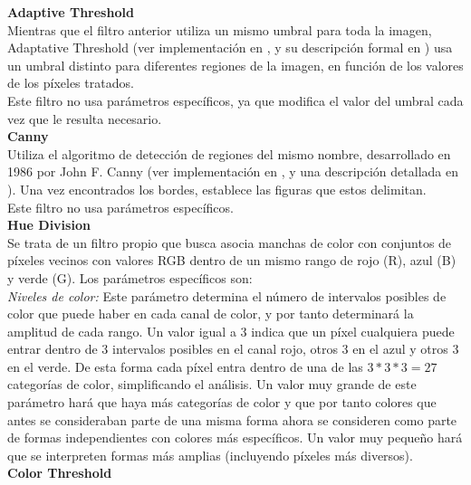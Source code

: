 	\noindent\textbf{Adaptive Threshold}\\

		Mientras que el filtro anterior utiliza un mismo umbral para toda la imagen, Adaptative Threshold (ver implementación en \cite{opencvDoc}, y su descripción formal en \cite{pajares}) usa un umbral distinto para diferentes regiones de la imagen, en función de los valores de los píxeles tratados.\\ 
		
		Este filtro no usa parámetros específicos, ya que modifica el valor del umbral cada vez que le resulta necesario.\\
		
	\noindent\textbf{Canny}\\

		Utiliza el algoritmo de detección de regiones del mismo nombre, desarrollado en 1986 por John F. Canny (ver implementación en \cite{opencvDoc}, y una descripción detallada en \cite{pajares}). Una vez encontrados los bordes, establece las figuras que estos delimitan.\\
		
		Este filtro no usa parámetros específicos.\\
		
	\noindent\textbf{Hue Division}\\


		Se trata de un filtro propio que busca asocia manchas de color con conjuntos de píxeles vecinos con valores RGB dentro de un mismo rango de rojo (R), azul (B) y verde (G). Los parámetros específicos son:\\
		
		\noindent\textit{Niveles de color:} Este parámetro determina el número de intervalos posibles de color que puede haber en cada canal de color, y por tanto determinará la amplitud de cada rango. Un valor igual a 3 indica que un píxel cualquiera puede entrar dentro de 3 intervalos posibles en el canal rojo, otros 3 en el azul y otros 3 en el verde. De esta forma cada píxel entra dentro de una de las $3*3*3=27$ categorías de color, simplificando el análisis. Un valor muy grande de este parámetro hará que haya más categorías de color y que por tanto colores que antes se consideraban parte de una misma forma ahora se consideren como parte de formas independientes con colores más específicos. Un valor muy pequeño hará que se interpreten formas más amplias (incluyendo píxeles más diversos).\\
		
	\noindent\textbf{Color Threshold}\\

